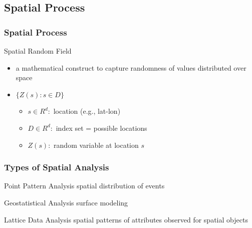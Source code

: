 \documentclass[nototal]{beamer}
\begin{document}
\subsection{Spatial Process}
\begin{frame}
  \frametitle{Spatial Process}
  \begin{block}{Spatial Random Field}
    \begin{itemize}
      \item a mathematical construct to capture randomness of values
	distributed over space
      \item $ \{ Z(s):s \in D \} $
	\begin{itemize}
	  \item $s \in R^d:$ location (e.g., lat-lon)
	  \item $D \in R^d:$ index set = possible locations
	  \item $Z(s):$ random variable at location $s$
	\end{itemize}
    \end{itemize}
   \end{block}
 \end{frame}
 \begin{frame}
   \frametitle{Types of Spatial Analysis}
   \begin{block}{Point Pattern Analysis}
      spatial distribution of events
    \end{block}
   \begin{block}{Geostatistical Analysis}
      surface modeling
    \end{block}
   \begin{block}{Lattice Data Analysis}
     spatial patterns of attributes observed for spatial objects
    \end{block}
  \end{frame}
\end{document}
